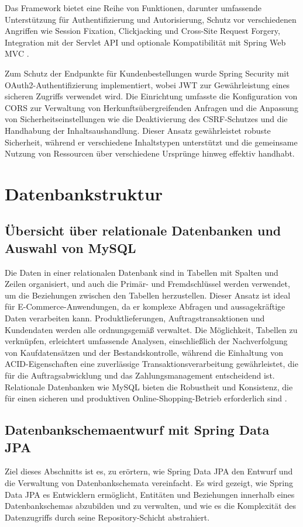 Das Framework bietet eine Reihe von Funktionen, darunter umfassende Unterstützung für Authentifizierung und Autorisierung, Schutz vor verschiedenen Angriffen wie Session Fixation, Clickjacking und Cross-Site Request Forgery, Integration mit der Servlet API und optionale Kompatibilität mit Spring Web MVC \cite{Spring-Security:o.J}.

Zum Schutz der Endpunkte für Kundenbestellungen wurde Spring Security mit OAuth2-Authentifizierung implementiert, wobei JWT zur Gewährleistung eines sicheren Zugriffs verwendet wird. Die Einrichtung umfasste die Konfiguration von CORS zur Verwaltung von Herkunftsübergreifenden Anfragen und die Anpassung von Sicherheitseinstellungen wie die Deaktivierung des CSRF-Schutzes und die Handhabung der Inhaltsaushandlung. Dieser Ansatz gewährleistet robuste Sicherheit, während er verschiedene Inhaltstypen unterstützt und die gemeinsame Nutzung von Ressourcen über verschiedene Ursprünge hinweg effektiv handhabt.


\section{Datenbankstruktur}
\subsection{Übersicht über relationale Datenbanken und Auswahl von MySQL}
Die Daten in einer relationalen Datenbank sind in Tabellen mit Spalten und Zeilen organisiert, und auch die Primär- und Fremdschlüssel werden verwendet, um die Beziehungen zwischen den Tabellen herzustellen. Dieser Ansatz ist ideal für E-Commerce-Anwendungen, da er komplexe Abfragen und aussagekräftige Daten verarbeiten kann. Produktlieferungen, Auftragstransaktionen und Kundendaten werden alle ordnungsgemäß verwaltet. Die Möglichkeit, Tabellen zu verknüpfen, erleichtert umfassende Analysen, einschließlich der Nachverfolgung von Kaufdatensätzen und der Bestandskontrolle, während die Einhaltung von ACID-Eigenschaften eine zuverlässige Transaktionsverarbeitung gewährleistet, die für die Auftragsabwicklung und das Zahlungsmanagement entscheidend ist. Relationale Datenbanken wie MySQL bieten die Robustheit und Konsistenz, die für einen sicheren und produktiven Online-Shopping-Betrieb erforderlich sind \cite{IBM:o.J}.

\subsection{Datenbankschemaentwurf mit Spring Data JPA}
Ziel dieses Abschnitts ist es, zu erörtern, wie Spring Data JPA den Entwurf und die Verwaltung von Datenbankschemata vereinfacht. Es wird gezeigt, wie Spring Data JPA es Entwicklern ermöglicht, Entitäten und Beziehungen innerhalb eines Datenbankschemas abzubilden und zu verwalten, und wie es die Komplexität des Datenzugriffs durch seine Repository-Schicht abstrahiert.

